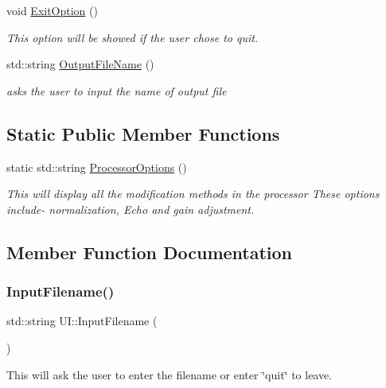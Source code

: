 \begin{DoxyCompactItemize}
void \hyperlink{classUI_a8d1d1f3df8d204f641c085a4d3730c1b}{Exit\+Option} ()
\begin{DoxyCompactList}\small\item\em This option will be showed if the user chose to quit. \end{DoxyCompactList}\item 
std\+::string \hyperlink{classUI_ad5a96cf0e114c4dac4a4d7958dd98c4a}{Output\+File\+Name} ()
\begin{DoxyCompactList}\small\item\em asks the user to input the name of output file \end{DoxyCompactList}\end{DoxyCompactItemize}
\subsection*{Static Public Member Functions}
\begin{DoxyCompactItemize}
\item 
static std\+::string \hyperlink{classUI_a3af627515035a845a98b24d7463da5dc}{Processor\+Options} ()
\begin{DoxyCompactList}\small\item\em This will display all the modification methods in the processor These options include-\/ normalization, Echo and gain adjustment. \end{DoxyCompactList}\end{DoxyCompactItemize}


\subsection{Member Function Documentation}
\mbox{\label{classUI_aac4ec5438f211612234d8f9be155eaf2}} 
\subsubsection{\texorpdfstring{Input\+Filename()}{InputFilename()}}
{\footnotesize\ttfamily std\+::string U\+I\+::\+Input\+Filename (\begin{DoxyParamCaption}{ }\end{DoxyParamCaption})}



This will ask the user to enter the filename or enter \char`\"{}quit\char`\"{} to leave. 


